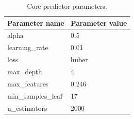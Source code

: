 \clearpage
\begin{table}[!htb]
	\centering
	\caption[Core predictor parameters.]{Core predictor parameters.} \label{tab:core_parameters}
	\begin{tabular}{ l | l }
		\toprule
		Parameter name     & Parameter value \\
		\midrule
		alpha              & 0.5             \\
		learning\_rate     & 0.01            \\
		loss               & huber           \\
		max\_depth         & 4               \\
		max\_features      & 0.246           \\
		min\_samples\_leaf & 17              \\
		n\_estimators      & 2000            \\
		\bottomrule
	\end{tabular}
\end{table}


